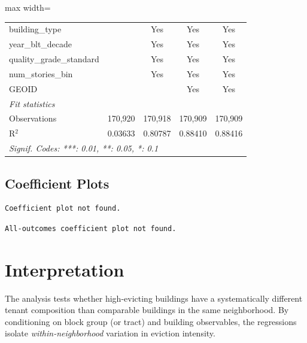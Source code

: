 \documentclass[
  11pt,
]{article}
\begin{document}
\begin{adjustbox}{max width=\textwidth}
\begin{tabular}{lcccc}
   building\_type                                              &                 & Yes             & Yes             & Yes\\  
   year\_blt\_decade                                           &                 & Yes             & Yes             & Yes\\  
   quality\_grade\_standard                                    &                 & Yes             & Yes             & Yes\\  
   num\_stories\_bin                                           &                 & Yes             & Yes             & Yes\\  
   GEOID                                                       &                 &                 & Yes             & Yes\\  
   \midrule
   \emph{Fit statistics}\\
   Observations                                                & 170,920         & 170,918         & 170,909         & 170,909\\  
   R$^2$                                                       & 0.03633         & 0.80787         & 0.88410         & 0.88416\\  
   \midrule \midrule
   \multicolumn{5}{l}{\emph{Signif. Codes: ***: 0.01, **: 0.05, *: 0.1}}\\
\end{tabular}
\par\endgroup

\end{adjustbox}

\subsection{Coefficient Plots}\label{coefficient-plots}

\begin{verbatim}
Coefficient plot not found.
\end{verbatim}

\begin{verbatim}
All-outcomes coefficient plot not found.
\end{verbatim}

\section{Interpretation}\label{interpretation}

The analysis tests whether high-evicting buildings have a systematically
different tenant composition than comparable buildings in the same
neighborhood. By conditioning on block group (or tract) and building
observables, the regressions isolate \emph{within-neighborhood}
variation in eviction intensity.
\end{document}
